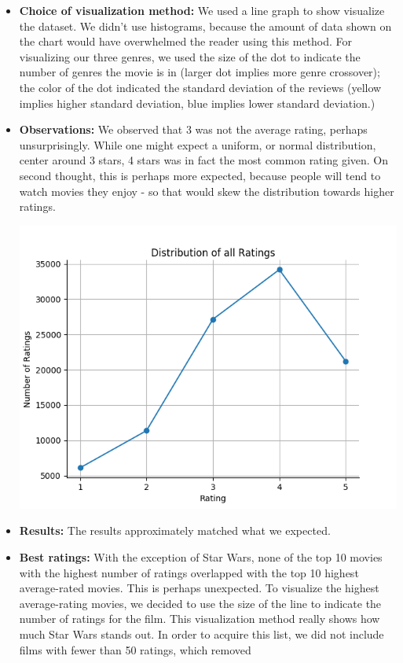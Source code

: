 \begin{itemize}
  \item \textbf{Choice of visualization method:} We used a line graph to show visualize the dataset. We didn't use histograms, because the amount of data shown on the chart would have overwhelmed the reader using this method. For visualizing our three genres, we used the size of the dot to indicate the number of genres the movie is in (larger dot implies more genre crossover); the color of the dot indicated the standard deviation of the reviews (yellow implies higher standard deviation, blue implies lower standard deviation.)
  \item \textbf{Observations:} We observed that 3 was not the average rating, perhaps unsurprisingly. While one might expect a uniform, or normal distribution, center around 3 stars, 4 stars was in fact the most common rating given. On second thought, this is perhaps more expected, because people will tend to watch movies they enjoy - so that would skew the distribution towards higher ratings.
  \begin{center}
    \includegraphics[scale=.6]{basic_1.png}
  \end{center}
  \item \textbf{Results:} The results approximately matched what we expected.
  \item \textbf{Best ratings:} With the exception of Star Wars, none of the top 10 movies with the highest number of ratings overlapped with the top 10 highest average-rated movies. This is perhaps unexpected. To visualize the highest average-rating movies, we decided to use the size of the line to indicate the number of ratings for the film. This visualization method really shows how much Star Wars stands out. In order to acquire this list, we did not include films with fewer than 50 ratings, which removed 

\end{itemize}
